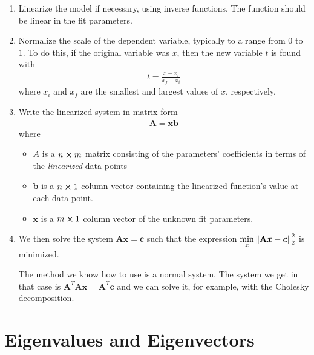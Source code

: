 \documentclass[11pt, a4paper]{article}
\newcommand{\mat}[1]{\mathbf{#1}} %
\begin{document}
\begin{enumerate}
	\item Linearize the model if necessary, using inverse functions. The function should be linear in the fit parameters.
	
	\item Normalize the scale of the dependent variable, typically to a range from $ 0 $ to $ 1 $. To do this, if the original variable was $ x $, then the new variable $ t $ is found with
	\begin{align*}
		t = \frac{x - x_i}{x_f - x_i}
	\end{align*}
	where $ x_i $ and $ x_f $ are the smallest and largest values of $ x $, respectively.
	
	\item Write the linearized system in matrix form
	\begin{align*}
		\mat{A} = \bm{x} \bm{b}
	\end{align*}
	where 
	\begin{itemize}
		\item $ A $ is a $ n \cross m $ matrix consisting of the parameters' coefficients in terms of the \textit{linearized} data points
		
		\item $ \bm{b} $ is a $ n \cross 1 $ column vector containing the linearized function's value at each data point.
		
		\item $ \bm{x} $ is a $ m \cross 1 $ column vector of the unknown fit parameters.
	\end{itemize}
	
	\item We then solve the system $ \mat{A} \bm{x} = \bm{c} $ such that the expression $ \displaystyle{\min_{x}\norm{\mat{A}\bm{x} - \bm{c}}_{2}^2 } $ is minimized. 
	
	The method we know how to use is a normal system. 
	The system we get in that case is $ \mat{A}^{T}\mat{A} \bm{x} = \mat{A}^{T}\bm{c} $ and we can solve it, for example, with the Cholesky decomposition.
\end{enumerate}
\fi

\section{Eigenvalues and Eigenvectors}
\end{document}
